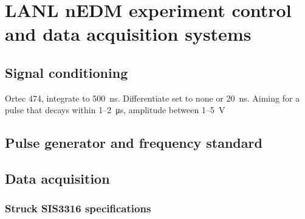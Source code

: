 
\chapter{LANL nEDM experiment control and data acquisition systems}\label{chap:daq}




\section{Signal conditioning}


Ortec 474, integrate to \qty{500}{\nano\second}. Differentiate set to none or \qty{20}{\nano\second}. Aiming for a pulse that decays within 1--\qty{2}{\micro \second}, amplitude between 1--\qty{5}{\volt}


\section{Pulse generator and frequency standard}\label{sec:pulse_gen_freq_std}



\cite{ds345_manual, rubidium_standard_fs725_manual}


\section{Data acquisition}




\subsection{Struck SIS3316 specifications}


\cite{sis3316_manual, sis3316_udp_addendum}

